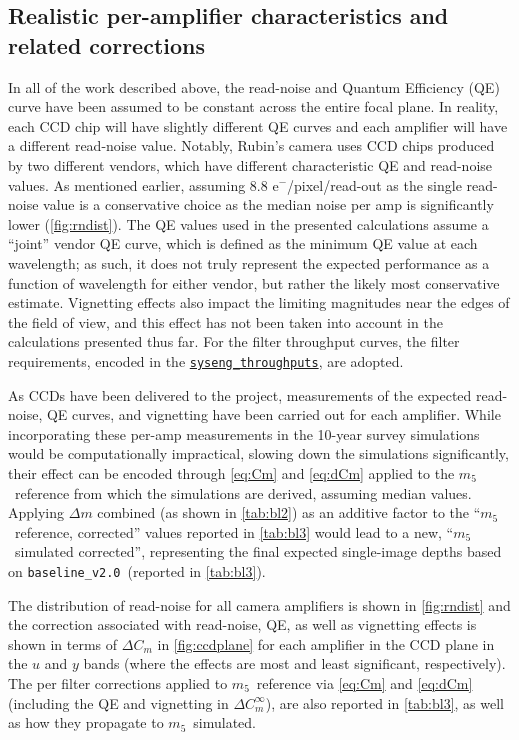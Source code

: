 \documentclass[PST,authoryear,toc]{lsstdoc}
\newcommand{\mf}{\ensuremath{m_5}}
\newcommand{\baseline}{\texttt{baseline\_v2.0}}
\begin{document}
\subsection{Realistic per-amplifier characteristics and related corrections}\label{sec:per-amp}
In all of the work described above, the read-noise and Quantum Efficiency (QE) curve have been assumed to be constant across the entire focal plane. In reality, each CCD chip will have slightly different QE curves and each amplifier will have a different read-noise value. Notably, Rubin's camera uses CCD chips produced by two different vendors, which have different characteristic QE and read-noise values.  As mentioned earlier, assuming 8.8 e$^-$/pixel/read-out as the single read-noise value is a conservative choice as the median noise per amp is significantly lower (\autoref{fig:rndist}). The QE values used in the presented calculations assume a ``joint'' vendor QE curve, which is defined as the minimum QE value at each wavelength; as such, it does not truly represent the expected performance as a function of wavelength for either vendor, but rather the likely most conservative estimate. Vignetting effects also impact the limiting magnitudes near the edges of the field of view, and this effect has not been taken into account in the calculations presented thus far. For the filter throughput curves, the filter requirements, encoded in the \href{https://github.com/lsst-pst/syseng_throughputs}{{\tt syseng\_throughputs}}, are adopted.

As CCDs have been delivered to the project, measurements of the expected read-noise, QE curves, and vignetting have been carried out for each amplifier. While incorporating these per-amp measurements in the 10-year survey simulations would be computationally impractical, slowing down the simulations significantly, their effect can be encoded through \autoref{eq:Cm} and \autoref{eq:dCm} applied to the \mf\ reference from which the simulations are derived, assuming median values. Applying $\Delta m$ combined (as shown in \autoref{tab:bl2}) as an additive factor to the ``\mf\ reference, corrected'' values reported in \autoref{tab:bl3} would lead to a new,  ``\mf\ simulated corrected'', representing the final expected single-image depths based on \baseline\ (reported in \autoref{tab:bl3}).

The distribution of read-noise for all camera amplifiers is shown in \autoref{fig:rndist} and the correction associated with read-noise, QE, as well as vignetting effects is shown in terms of $\Delta C_m$ in \autoref{fig:ccdplane} for each amplifier in the CCD plane in the $u$ and $y$ bands (where the effects are most and least significant, respectively).
The per filter corrections applied to \mf\ reference via \autoref{eq:Cm} and \autoref{eq:dCm} (including the QE and vignetting in $\Delta C_m^\infty$), are also reported in \autoref{tab:bl3}, as well as how they propagate to \mf\ simulated.
\end{document}
